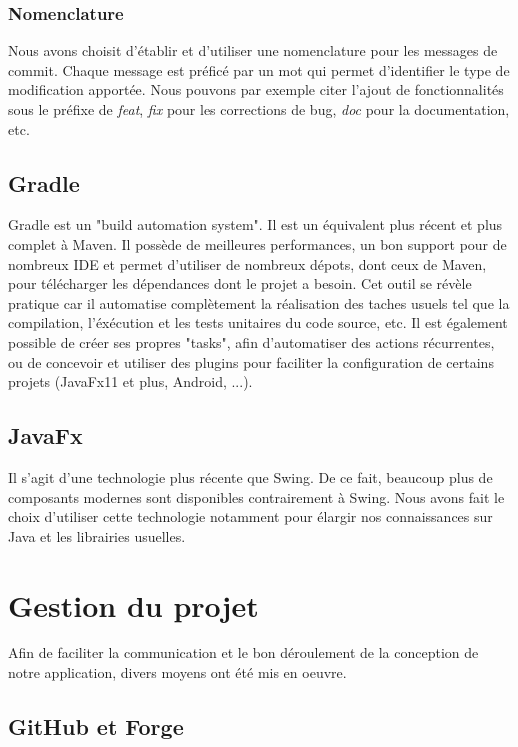			\subsubsection{Nomenclature}

				Nous avons choisit d'établir et d'utiliser une nomenclature pour les messages de commit. Chaque message est préficé par un mot qui permet d'identifier le type de modification apportée. Nous pouvons par exemple citer l'ajout de fonctionnalités sous le préfixe de \textit{feat}, \textit{fix} pour les corrections de bug, \textit{doc} pour la documentation, etc.\\

		\subsection{Gradle}

			Gradle est un "build automation system". Il est un équivalent plus récent et plus complet à Maven. Il possède de meilleures performances, un bon support pour de nombreux IDE et permet d'utiliser de nombreux dépots, dont ceux de Maven, pour télécharger les dépendances dont le projet a besoin. Cet outil se révèle pratique car il automatise complètement la réalisation des taches usuels tel que la compilation, l'éxécution et les tests unitaires du code source, etc. Il est également possible de créer ses propres "tasks", afin d'automatiser des actions récurrentes, ou de concevoir et utiliser des plugins pour faciliter la configuration de certains projets (JavaFx11 et plus, Android, ...).

		\subsection{JavaFx}

			Il s'agit d'une technologie plus récente que Swing. De ce fait, beaucoup plus de composants modernes sont disponibles contrairement à Swing. Nous avons fait le choix d'utiliser cette technologie notamment pour élargir nos connaissances sur Java et les librairies usuelles.

	\section{Gestion du projet}

		Afin de faciliter la communication et le bon déroulement de la conception de notre application, divers moyens ont été mis en oeuvre.

		\subsection{GitHub et Forge}

